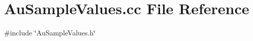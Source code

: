 \section{Au\+Sample\+Values.\+cc File Reference}
\label{AuSampleValues_8cc}
{\ttfamily \#include \char`\"{}Au\+Sample\+Values.\+h\char`\"{}}\newline
